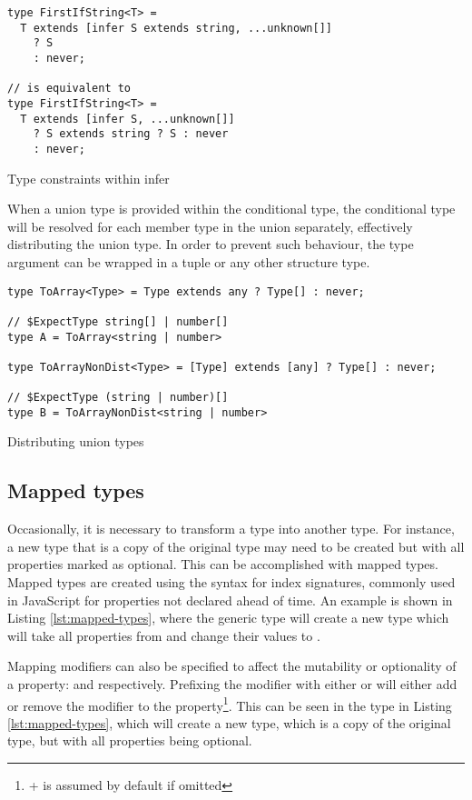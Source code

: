 \begin{listing}[ht]
  \begin{verbatim}
type FirstIfString<T> =
  T extends [infer S extends string, ...unknown[]]
    ? S
    : never;

// is equivalent to 
type FirstIfString<T> =
  T extends [infer S, ...unknown[]]
    ? S extends string ? S : never
    : never;
\end{verbatim}
  \caption{Type constraints within infer}\label{lst:infer-constraint}
\end{listing}

When a union type is provided within the conditional type, the conditional type will be resolved for each member type in the union separately, effectively distributing the union type. In order to prevent such behaviour, the type argument can be wrapped in a tuple or any other structure type.

\begin{listing}[ht]
  \begin{verbatim}
type ToArray<Type> = Type extends any ? Type[] : never;

// $ExpectType string[] | number[]
type A = ToArray<string | number> 

type ToArrayNonDist<Type> = [Type] extends [any] ? Type[] : never;

// $ExpectType (string | number)[]
type B = ToArrayNonDist<string | number> 
\end{verbatim}
  \caption{Distributing union types}\label{lst:distribute}
\end{listing}

\subsection{Mapped types}

Occasionally, it is necessary to transform a type into another type. For instance, a new type that is a copy of the original type may need to be created but with all properties marked as optional. This can be accomplished with mapped types. Mapped types are created using the syntax for index signatures, commonly used in JavaScript for properties not declared ahead of time. An example is shown in Listing \ref{lst:mapped-types}, where the generic type  will create a new type which will take all properties from  and change their values to .

Mapping modifiers can also be specified to affect the mutability or optionality of a property:  and  respectively. Prefixing the modifier with either \code{+} or \code{-} will either add or remove the modifier to the property\footnote{+ is assumed by default if omitted}. This can be seen in the  type in Listing \ref{lst:mapped-types}, which will create a new type, which is a copy of the original type, but with all properties being optional.


